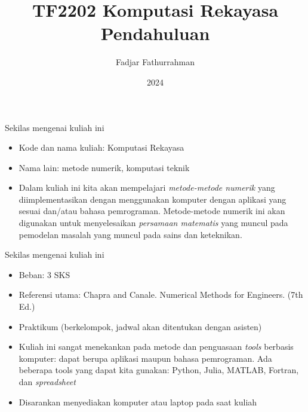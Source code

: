 

\title{TF2202 Komputasi Rekayasa\\
Pendahuluan}
\author{Fadjar Fathurrahman}
\date{2024}



\frame{\titlepage}
\ifdefined\Shaded\renewenvironment{Shaded}{\begin{tcolorbox}[enhanced, borderline west={3pt}{0pt}{shadecolor}, interior hidden, sharp corners, boxrule=0pt, frame hidden, breakable]}{\end{tcolorbox}}\fi



\begin{frame}{Sekilas mengenai kuliah ini}

\begin{itemize}
\item
  Kode dan nama kuliah: Komputasi Rekayasa
\item
  Nama lain: metode numerik, komputasi teknik
\item
  Dalam kuliah ini kita akan mempelajari \emph{metode-metode numerik}
  yang diimplementasikan dengan menggunakan komputer dengan aplikasi
  yang sesuai dan/atau bahasa pemrograman. Metode-metode numerik ini
  akan digunakan untuk menyelesaikan \emph{persamaan matematis} yang
  muncul pada pemodelan masalah yang muncul pada sains dan keteknikan.
\end{itemize}
\end{frame}




\begin{frame}{Sekilas mengenai kuliah ini}

\begin{itemize}
\item Beban: 3 SKS
\item Referensi utama: Chapra and Canale. Numerical Methods for Engineers. (7th Ed.)
\item Praktikum (berkelompok, jadwal akan ditentukan dengan asisten)
\item Kuliah ini sangat menekankan pada metode dan penguasaan \textit{tools}
berbasis komputer: dapat berupa aplikasi maupun bahasa pemrograman.
Ada beberapa tools yang dapat kita gunakan: Python, Julia, MATLAB, Fortran, dan
\emph{spreadsheet}
\item Disarankan menyediakan komputer atau laptop pada saat kuliah
\end{itemize}

\end{frame}


